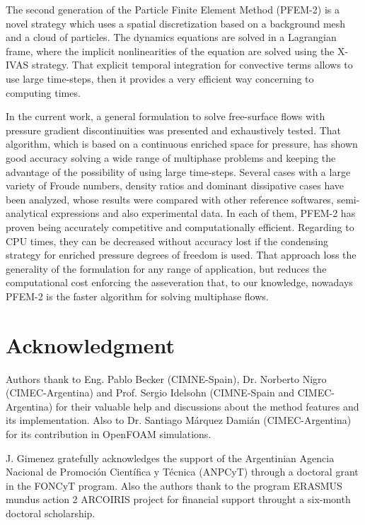 \documentclass[review]{elsarticle}
\begin{document}
The second generation of the Particle Finite Element Method (PFEM-2) is a novel strategy which uses a spatial discretization based on a background mesh and a cloud of particles. The dynamics equations are solved in a Lagrangian frame, where the implicit nonlinearities of the equation are solved using the {X-IVAS} strategy. That explicit temporal integration for convective terms allows to use large time-steps, then it provides a very efficient way concerning to computing times.

In the current work, a general formulation to solve free-surface flows with pressure gradient discontinuities was presented and exhaustively tested. That algorithm, which is based on a continuous enriched space for pressure, has shown good accuracy solving a wide range of multiphase problems and keeping the advantage of the possibility of using large time-steps. Several cases with a large variety of Froude numbers, density ratios and dominant dissipative cases have been analyzed, whose results were compared with other reference softwares, semi-analytical expressions and also experimental data. In each of them, PFEM-2 has proven being accurately competitive and computationally efficient. Regarding to CPU times, they can be decreased without accuracy lost if the condensing strategy for enriched pressure degrees of freedom is used. That approach loss the generality of the formulation for any range of application, but reduces the computational cost enforcing the asseveration that, to our knowledge, nowadays PFEM-2 is the faster algorithm for solving multiphase flows.

\section*{Acknowledgment}

Authors thank to Eng. Pablo Becker (CIMNE-Spain), Dr. Norberto Nigro (CIMEC-Argentina) and Prof. Sergio Idelsohn (CIMNE-Spain and CIMEC-Argentina) for their valuable help and discussions about the method features and its implementation. Also to Dr. Santiago M\'arquez Dami\'an (CIMEC-Argentina) for its contribution in OpenFOAM simulations.

J. Gimenez gratefully acknowledges the support of the Argentinian Agencia Nacional de Promoci\'on Cient\'ifica y T\' ecnica (ANPCyT) through a doctoral grant in the FONCyT program. Also the authors thank to the program ERASMUS mundus action 2 ARCOIRIS project for financial support throught a six-month doctoral scholarship.
\end{document}
